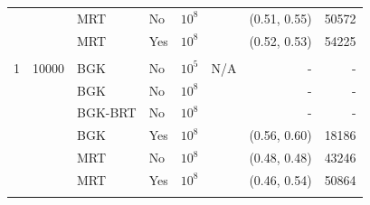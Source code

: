 \documentclass{article}
\begin{document}
\begin{table}
\begin{tabulary}{\linewidth}{r r l l r r r r}
  &      & MRT     & No  & $10^8$ &              & (0.51, 0.55) & 50572 \\
  &      & MRT     & Yes & $10^8$ &              & (0.52, 0.53) & 54225 \\
\\
1 & 10000 & BGK     & No  & $10^5$ & N/A          & - & - \\
  &       & BGK     & No  & $10^8$ &              & - & - \\
  &       & BGK-BRT & No  & $10^8$ &              & - & - \\
  &       & BGK     & Yes & $10^8$ &              & (0.56, 0.60) & 18186 \\
  &       & MRT     & No  & $10^8$ &              & (0.48, 0.48) & 43246 \\
  &       & MRT     & Yes & $10^8$ &              & (0.46, 0.54) & 50864 \\
\\
\end{tabulary}
\label{tab:lid-bing1}
\end{table}
\end{document}
